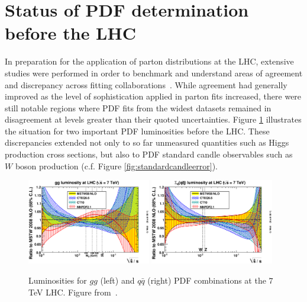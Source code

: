 \section{Status of PDF determination before the LHC}
In preparation for the application of parton distributions at the LHC, extensive studies were performed in order to benchmark and understand areas of agreement and discrepancy across fitting collaborations~\cite{Watt:2011kp,Dittmar:2009ii}. While agreement had generally improved as the level of sophistication applied in parton fits increased, there were still notable regions where PDF fits from the widest datasets remained in disagreement at levels greater than their quoted uncertainties. Figure \ref{fig:pdflumidiff} illustrates the situation for two important PDF luminosities before the LHC. These discrepancies extended not only to so far unmeasured quantities such as Higgs production cross sections, but also to PDF standard candle observables such as $W$ boson production (c.f. Figure \ref{fig:standardcandleerror}).

\begin{figure}[t]
\centering
\includegraphics[width=0.48\textwidth]{3-PDFdet/figs/ratiogglumi1_68cl.eps}
\includegraphics[width=0.48\textwidth]{3-PDFdet/figs/ratioqqbarlumi1_68cl.eps}
\caption[Luminosities for $gg$ and $q\bar{q}$ PDF combinations at the $7$ TeV LHC]{Luminosities for $gg$ (left) and $q\bar{q}$ (right) PDF combinations at the $7$ TeV LHC. Figure from~\cite{Watt:2011kp}.}
\label{fig:pdflumidiff}
\end{figure}


